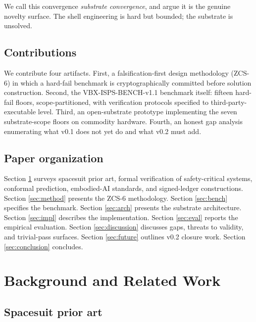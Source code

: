 \documentclass[conference]{IEEEtran}
\theoremstyle{definition}
\theoremstyle{plain}
\theoremstyle{remark}
\begin{document}
We call this convergence \emph{substrate convergence}, and argue it is the genuine novelty surface. The shell engineering is hard but bounded; the substrate is unsolved.

\subsection{Contributions}

We contribute four artifacts. First, a falsification-first design methodology (ZCS-6) in which a hard-fail benchmark is cryptographically committed before solution construction. Second, the VBX-ISPS-BENCH-v1.1 benchmark itself: fifteen hard-fail floors, scope-partitioned, with verification protocols specified to third-party-executable level. Third, an open-substrate prototype implementing the seven substrate-scope floors on commodity hardware. Fourth, an honest gap analysis enumerating what v0.1 does not yet do and what v0.2 must add.

\subsection{Paper organization}

Section \ref{sec:relwork} surveys spacesuit prior art, formal verification of safety-critical systems, conformal prediction, embodied-AI standards, and signed-ledger constructions. Section \ref{sec:method} presents the ZCS-6 methodology. Section \ref{sec:bench} specifies the benchmark. Section \ref{sec:arch} presents the substrate architecture. Section \ref{sec:impl} describes the implementation. Section \ref{sec:eval} reports the empirical evaluation. Section \ref{sec:discussion} discusses gaps, threats to validity, and trivial-pass surfaces. Section \ref{sec:future} outlines v0.2 closure work. Section \ref{sec:conclusion} concludes.

\section{Background and Related Work}
\label{sec:relwork}

\subsection{Spacesuit prior art}
\end{document}

